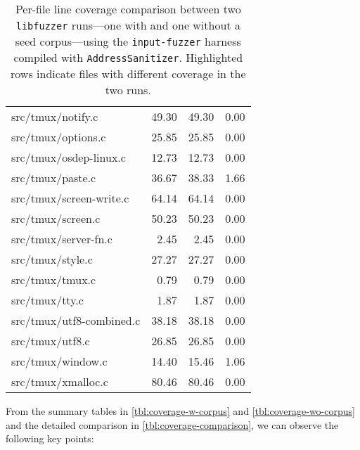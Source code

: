 \begin{table*}[ht]
\begin{supertabular}{lrrr}
		src/tmux/notify.c                  & 49.30 & 49.30 &  0.00 \\
		src/tmux/options.c                 & 25.85 & 25.85 &  0.00 \\
		src/tmux/osdep-linux.c             & 12.73 & 12.73 &  0.00 \\
		 src/tmux/paste.c                   & 36.67 & 38.33 &  1.66 \\
		src/tmux/screen-write.c            & 64.14 & 64.14 &  0.00 \\
		src/tmux/screen.c                  & 50.23 & 50.23 &  0.00 \\
		src/tmux/server-fn.c               &  2.45 &  2.45 &  0.00 \\
		src/tmux/style.c                   & 27.27 & 27.27 &  0.00 \\
		src/tmux/tmux.c                    &  0.79 &  0.79 &  0.00 \\
		src/tmux/tty.c                     &  1.87 &  1.87 &  0.00 \\
		src/tmux/utf8-combined.c           & 38.18 & 38.18 &  0.00 \\
		src/tmux/utf8.c                    & 26.85 & 26.85 &  0.00 \\
		 src/tmux/window.c                  & 14.40 & 15.46 &  1.06 \\
		src/tmux/xmalloc.c                 & 80.46 & 80.46 &  0.00 \\
	\end{supertabular}
	\caption{Per-file line coverage comparison between two \texttt{libfuzzer} runs---one with and one without a seed corpus---using the \texttt{input-fuzzer} harness compiled with \texttt{AddressSanitizer}. Highlighted rows indicate files with different coverage in the two runs.}
	\label{tbl:coverage-comparison}
\end{table*}

From the summary tables in \autoref{tbl:coverage-w-corpus} and \autoref{tbl:coverage-wo-corpus} and the detailed comparison in \autoref{tbl:coverage-comparison}, we can observe the following key points:

